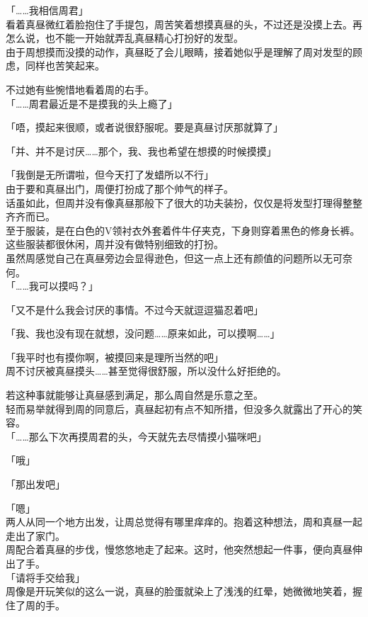 「……我相信周君」\\

看着真昼微红着脸抱住了手提包，周苦笑着想摸真昼的头，不过还是没摸上去。再怎么说，也不能一开始就弄乱真昼精心打扮好的发型。\\

由于周想摸而没摸的动作，真昼眨了会儿眼睛，接着她似乎是理解了周对发型的顾虑，同样也苦笑起来。

不过她有些惋惜地看着周的右手。\\

「……周君最近是不是摸我的头上瘾了」

「唔，摸起来很顺，或者说很舒服呢。要是真昼讨厌那就算了」

「并、并不是讨厌……那个，我、我也希望在想摸的时候摸摸」

「我倒是无所谓啦，但今天打了发蜡所以不行」\\

由于要和真昼出门，周便打扮成了那个帅气的样子。\\

话虽如此，但周并没有像真昼那般下了很大的功夫装扮，仅仅是将发型打理得整整齐齐而已。\\

至于服装，是在白色的V领衬衣外套着件牛仔夹克，下身则穿着黑色的修身长裤。这些服装都很休闲，周并没有做特别细致的打扮。\\

虽然周感觉自己在真昼旁边会显得逊色，但这一点上还有颜值的问题所以无可奈何。\\

「……我可以摸吗？」

「又不是什么我会讨厌的事情。不过今天就逗逗猫忍着吧」

「我、我也没有现在就想，没问题……原来如此，可以摸啊……」

「我平时也有摸你啊，被摸回来是理所当然的吧」\\

周不讨厌被真昼摸头……甚至觉得很舒服，所以没什么好拒绝的。

若这种事就能够让真昼感到满足，那么周自然是乐意之至。\\

轻而易举就得到周的同意后，真昼起初有点不知所措，但没多久就露出了开心的笑容。\\

「……那么下次再摸周君的头，今天就先去尽情摸小猫咪吧」

「哦」

「那出发吧」

「嗯」\\

两人从同一个地方出发，让周总觉得有哪里痒痒的。抱着这种想法，周和真昼一起走出了家门。\\

周配合着真昼的步伐，慢悠悠地走了起来。这时，他突然想起一件事，便向真昼伸出了手。\\

「请将手交给我」\\

周像是开玩笑似的这么一说，真昼的脸蛋就染上了浅浅的红晕，她微微地笑着，握住了周的手。
